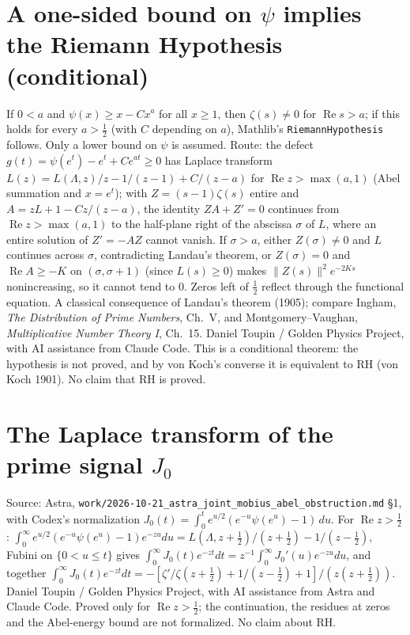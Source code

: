 \documentclass{report}
\theoremstyle{definition}
\begin{document}
\begin{itemize}
\begin{itemize}
\section{A one-sided bound on $\psi$ implies the Riemann Hypothesis (conditional)}
If $0<a$ and $\psi(x)\ge x-Cx^a$ for all $x\ge1$, then $\zeta(s)\ne0$ for $\operatorname{Re}s>a$; if this holds for every $a>\tfrac12$ (with $C$
depending on $a$), Mathlib's \texttt{RiemannHypothesis} follows. Only a lower bound on $\psi$ is assumed. Route: the defect
$g(t)=\psi(e^t)-e^t+Ce^{at}\ge0$ has Laplace transform $L(z)=L(\Lambda,z)/z-1/(z-1)+C/(z-a)$ for $\operatorname{Re}z>\max(a,1)$
(Abel summation and $x=e^t$); with $Z=(s-1)\zeta(s)$ entire and $A=zL+1-Cz/(z-a)$, the identity $ZA+Z'=0$ continues from
$\operatorname{Re}z>\max(a,1)$ to the half-plane right of the abscissa $\sigma$ of $L$, where an entire solution of $Z'=-AZ$ cannot vanish.
If $\sigma>a$, either $Z(\sigma)\ne0$ and $L$ continues across $\sigma$, contradicting Landau's theorem, or $Z(\sigma)=0$ and
$\operatorname{Re}A\ge-K$ on $(\sigma,\sigma+1)$ (since $L(s)\ge0$) makes $\|Z(s)\|^2e^{-2Ks}$ nonincreasing, so it cannot tend to $0$.
Zeros left of $\tfrac12$ reflect through the functional equation. A classical consequence of Landau's theorem (1905); compare
Ingham, \emph{The Distribution of Prime Numbers}, Ch.~V, and Montgomery--Vaughan, \emph{Multiplicative Number Theory I}, Ch.~15. Daniel Toupin / Golden Physics Project,
with AI assistance from Claude Code. This is a conditional theorem: the hypothesis is not proved, and by von Koch's converse it is
equivalent to RH (von Koch 1901). No claim that RH is proved.

\section{The Laplace transform of the prime signal $J_0$}
Source: Astra, \texttt{work/2026-10-21\_astra\_joint\_mobius\_abel\_obstruction.md} \S1, with Codex's normalization
$J_0(t)=\int_0^te^{u/2}(e^{-u}\psi(e^u)-1)\,du$. For $\operatorname{Re}z>\tfrac12$:
$\int_0^\infty e^{u/2}(e^{-u}\psi(e^u)-1)e^{-zu}du=L(\Lambda,z+\tfrac12)/(z+\tfrac12)-1/(z-\tfrac12)$, Fubini on $\{0<u\le t\}$ gives
$\int_0^\infty J_0(t)e^{-zt}dt=z^{-1}\int_0^\infty J_0'(u)e^{-zu}du$, and together
$\int_0^\infty J_0(t)e^{-zt}dt=-[\zeta'/\zeta(z+\tfrac12)+1/(z-\tfrac12)+1]/(z(z+\tfrac12))$. Daniel Toupin / Golden Physics Project, with AI
assistance from Astra and Claude Code. Proved only for $\operatorname{Re}z>\tfrac12$; the continuation, the residues at zeros and the
Abel-energy bound are not formalized. No claim about RH.


\end{itemize}
\end{itemize}
\end{document}
